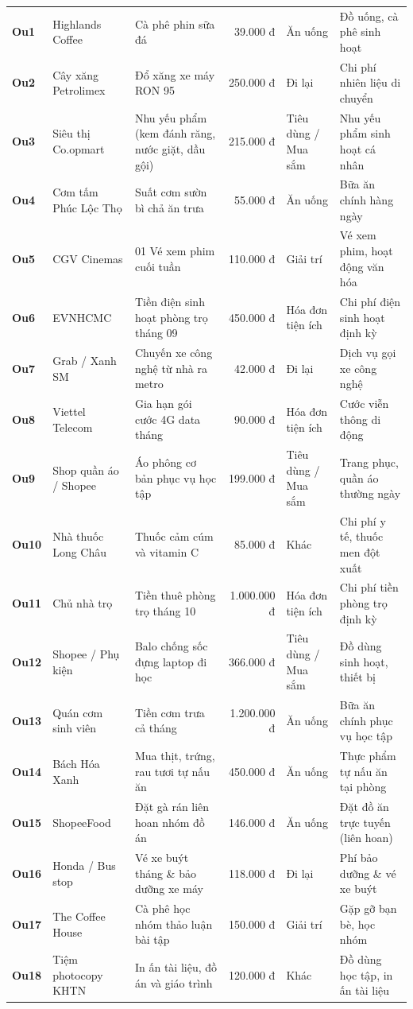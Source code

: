 \documentclass[11pt, a4paper]{article}
\begin{document}
\begin{longtable}{>{\bfseries}l p{2.8cm} p{3.2cm} r p{2.5cm} p{3cm}}
Ou1  & Highlands Coffee & Cà phê phin sữa đá & 39.000 đ & Ăn uống & Đồ uống, cà phê sinh hoạt \\
Ou2  & Cây xăng Petrolimex & Đổ xăng xe máy RON 95 & 250.000 đ & Đi lại & Chi phí nhiên liệu di chuyển \\
Ou3  & Siêu thị Co.opmart & Nhu yếu phẩm (kem đánh răng, nước giặt, dầu gội) & 215.000 đ & Tiêu dùng / Mua sắm & Nhu yếu phẩm sinh hoạt cá nhân \\
Ou4  & Cơm tấm Phúc Lộc Thọ & Suất cơm sườn bì chả ăn trưa & 55.000 đ & Ăn uống & Bữa ăn chính hàng ngày \\
Ou5  & CGV Cinemas & 01 Vé xem phim cuối tuần & 110.000 đ & Giải trí & Vé xem phim, hoạt động văn hóa \\
Ou6  & EVNHCMC & Tiền điện sinh hoạt phòng trọ tháng 09 & 450.000 đ & Hóa đơn tiện ích & Chi phí điện sinh hoạt định kỳ \\
Ou7  & Grab / Xanh SM & Chuyến xe công nghệ từ nhà ra metro & 42.000 đ & Đi lại & Dịch vụ gọi xe công nghệ \\
Ou8  & Viettel Telecom & Gia hạn gói cước 4G data tháng & 90.000 đ & Hóa đơn tiện ích & Cước viễn thông di động \\
Ou9  & Shop quần áo / Shopee & Áo phông cơ bản phục vụ học tập & 199.000 đ & Tiêu dùng / Mua sắm & Trang phục, quần áo thường ngày \\
Ou10 & Nhà thuốc Long Châu & Thuốc cảm cúm và vitamin C & 85.000 đ & Khác & Chi phí y tế, thuốc men đột xuất \\
Ou11 & Chủ nhà trọ & Tiền thuê phòng trọ tháng 10 & 1.000.000 đ & Hóa đơn tiện ích & Chi phí tiền phòng trọ định kỳ \\
Ou12 & Shopee / Phụ kiện & Balo chống sốc đựng laptop đi học & 366.000 đ & Tiêu dùng / Mua sắm & Đồ dùng sinh hoạt, thiết bị \\
Ou13 & Quán cơm sinh viên & Tiền cơm trưa cả tháng & 1.200.000 đ & Ăn uống & Bữa ăn chính phục vụ học tập \\
Ou14 & Bách Hóa Xanh & Mua thịt, trứng, rau tươi tự nấu ăn & 450.000 đ & Ăn uống & Thực phẩm tự nấu ăn tại phòng \\
Ou15 & ShopeeFood & Đặt gà rán liên hoan nhóm đồ án & 146.000 đ & Ăn uống & Đặt đồ ăn trực tuyến (liên hoan) \\
Ou16 & Honda / Bus stop & Vé xe buýt tháng \& bảo dưỡng xe máy & 118.000 đ & Đi lại & Phí bảo dưỡng \& vé xe buýt \\
Ou17 & The Coffee House & Cà phê học nhóm thảo luận bài tập & 150.000 đ & Giải trí & Gặp gỡ bạn bè, học nhóm \\
Ou18 & Tiệm photocopy KHTN & In ấn tài liệu, đồ án và giáo trình & 120.000 đ & Khác & Đồ dùng học tập, in ấn tài liệu \\
\end{longtable}
\normalsize
\end{document}
